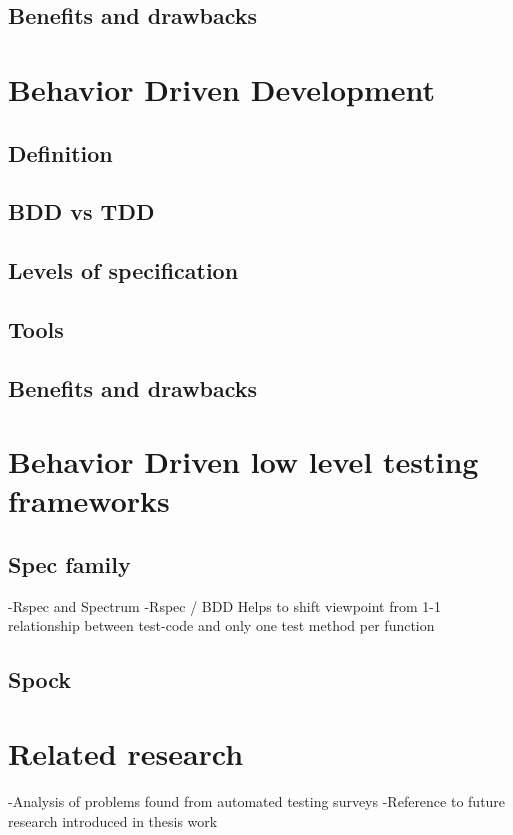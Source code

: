     \subsection{Benefits and drawbacks}
\section{Behavior Driven Development}
    \subsection{Definition}
    \subsection{BDD vs TDD}
    \subsection{Levels of specification}
    \subsection{Tools}
    \subsection{Benefits and drawbacks}
\section{Behavior Driven low level testing frameworks}
    \subsection{Spec family}
            -Rspec and Spectrum\newline
            -Rspec / BDD Helps to shift viewpoint from 1-1 relationship between test-code and only one test method per function
    \subsection{Spock}
\section{Related research}
    -Analysis of problems found from automated testing surveys\newline
    -Reference to future research introduced in thesis work\newline

